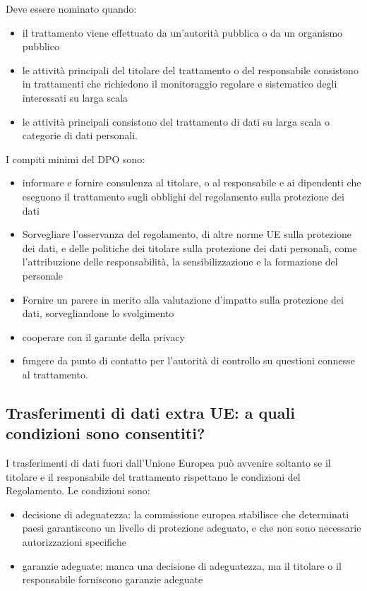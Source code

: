 Deve essere nominato quando:
\begin{itemize}
    \item il trattamento viene effettuato da un'autorità pubblica o da un
        organismo pubblico
    \item le attività principali del titolare del trattamento o del
        responsabile consistono in trattamenti che richiedono il monitoraggio
        regolare e sistematico degli interessati su larga scala
    \item le attività principali consistono del trattamento di dati su larga
        scala o categorie di dati personali.
\end{itemize}
I compiti minimi del DPO sono:
\begin{itemize}
    \item informare e fornire consulenza al titolare, o al responsabile e ai
        dipendenti che eseguono il trattamento sugli obblighi del regolamento
        sulla protezione dei dati
    \item Sorvegliare l'osservanza del regolamento, di altre norme UE sulla
        protezione dei dati, e delle politiche dei titolare sulla protezione
        dei dati personali, come l'attribuzione delle responsabilità, la
        sensibilizzazione e la formazione del personale
    \item Fornire un parere in merito alla valutazione d'impatto sulla
        protezione dei dati, sorvegliandone lo svolgimento
    \item cooperare con il garante della privacy
    \item fungere da punto di contatto per l'autorità di controllo su questioni
        connesse al trattamento.
\end{itemize}

\subsection{Trasferimenti di dati extra UE: a quali condizioni sono consentiti?}

I trasferimenti di dati fuori dall'Unione Europea può avvenire soltanto se il titolare e il
responsabile del trattamento rispettano le condizioni del Regolamento.
\newline
Le condizioni sono:
\begin{itemize}
    \item decisione di adeguatezza: la commissione europea stabilisce che
        determinati paesi garantiscono un livello di protezione adeguato, e che
        non sono necessarie autorizzazioni specifiche
    \item garanzie adeguate: manca una decisione di adeguatezza, ma il titolare
        o il responsabile forniscono garanzie adeguate
\end{itemize}

